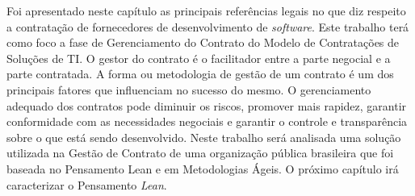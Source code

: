 Foi apresentado neste capítulo as principais referências legais no que diz respeito a contratação de fornecedores de desenvolvimento de \textit{software}. Este trabalho terá como foco a fase de Gerenciamento do Contrato do Modelo de Contratações de Soluções de TI. O gestor do contrato é o facilitador entre a parte negocial e a parte contratada. A forma ou metodologia de gestão de um contrato é um dos principais fatores que influenciam no sucesso do mesmo. O gerenciamento adequado dos contratos pode diminuir os riscos, promover mais rapidez, garantir conformidade com as necessidades negociais e garantir o controle e transparência sobre o que está sendo desenvolvido. Neste trabalho será analisada uma solução utilizada na Gestão de Contrato de uma organização pública brasileira que foi baseada no Pensamento Lean e em Metodologias Ágeis. O próximo capítulo irá caracterizar o Pensamento \textit{Lean}.

